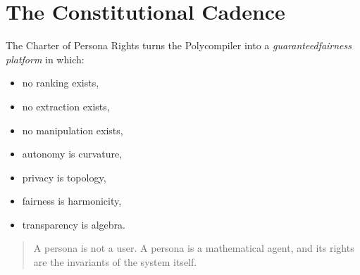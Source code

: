 \section{The Constitutional Cadence}

The Charter of Persona Rights turns the Polycompiler into  
a \emph{guaranteed\textendash fairness platform} in which:

\begin{itemize}
    \item no ranking exists,
    \item no extraction exists,
    \item no manipulation exists,
    \item autonomy is curvature,
    \item privacy is topology,
    \item fairness is harmonicity,
    \item transparency is algebra.
\end{itemize}

\begin{quote}
A persona is not a user.  
A persona is a mathematical agent,  
and its rights are the invariants of the system itself.
\end{quote}
